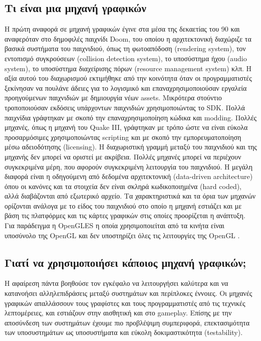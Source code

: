 	\subsection {Τι είναι μια μηχανή γραφικών}
	Η πρώτη αναφορά σε μηχανή γραφικών έγινε στα μέσα της δεκαετίας του 90 και αναφερόταν στο δημοφιλές παιχνίδι Doom, του οποίου η αρχιτεκτονική διαχώριζε τα βασικά συστήματα του παιχνιδιού, όπως τη φωτοαπόδοση (rendering system), τον εντοπισμό συγκρούσεων (collision detection system), το υποσύστημα ήχου (audio system), το υποσύστημα διαχείρισης πόρων (resource management system) κλπ. Η αξία αυτού του διαχωρισμού εκτιμήθηκε από την κοινότητα όταν οι προγραμματιστές ξεκίνησαν να πουλάνε άδειες για το λογισμικό και επαναχρησιμοποιούσαν εργαλεία προηγούμενων παιχνιδιών με δημιουργία νέων assets. Μικρότερα στούντιο τροποποιούσαν εκδόσεις υπάρχοντων παιχνιδιών χρησιμοποιώντας το \gls{SDK}.
	Πολλά παιχνίδια γράφτηκαν με σκοπό την επαναχρησιμοποίηση κώδικα και \gls{modding}. Πολλές μηχανές, όπως η μηχανή του Quake III, γράφτηκαν με τρόπο ώστε να είναι εύκολα προσαρμόσιμες χρησιμοποιώντας scripting και με σκοπό την εμπορευματοποίηση μέσω αδειοδότησης (licensing).
	Η διαχωριστική γραμμή μεταξύ του παιχνιδιού και της μηχανής δεν μπορεί να οριστεί με ακρίβεια. Πολλές μηχανές μπορεί να περιέχουν συγκεκριμένα μέρη, που αφορούν συγκεκριμένη λειτουργία του παιχνιδιού. Η μεγάλη διαφορά είναι η οδηγούμενη από δεδομένα αρχιτεκτονική (data-driven architecture) όπου οι κανόνες και τα στοιχεία δεν είναι σκληρά κωδικοποιημένα (hard coded), αλλά διαβάζονται από εξωτερικό αρχείο.
	Τα χαρακτηριστικά και τα όρια των μηχανών ορίζονται ανάλογα με το είδος του παιχνιδιού στο οποίο η μηχανή εστιάζει και με βάση τις πλατφόρμες και τις κάρτες γραφικών στις οποίες προορίζεται η ανάπτυξη. Για παράδειγμα η \gls{OpenGLES} η οποία χρησιμοποιείται από τα κινήτα είναι υποσύνολο της \gls{OpenGL} και δεν υποστηρίζει όλες τις λειτουργίες της \gls{OpenGL} \cite{opengleslimitations}.
	
	\subsection{Γιατί να χρησιμοποιήσει κάποιος μηχανή γραφικών;}	
	Η αφαίρεση πάντα βοηθούσε τον εγκέφαλο να λειτουργήσει καλύτερα και να κατανοήσει αλληλεπιδράσεις μεταξύ συστημάτων και περίπλοκες έννοιες. Οι μηχανές γραφικών απαλλάσσουν τους γραφίστες και τους προγραμματιστές από τις τεχνικές λεπτομέρειες, και εστιάζουν στην αισθητική και στο gameplay. Επίσης με την αποσύνδεση των συστημάτων έχουμε πιο προβλέψιμη συμπεριφορά, επεκτασιμότητα των υποσυστημάτων ως υποσυστήματα και εύκολη δοκιμαστικότητα (testability).
	
